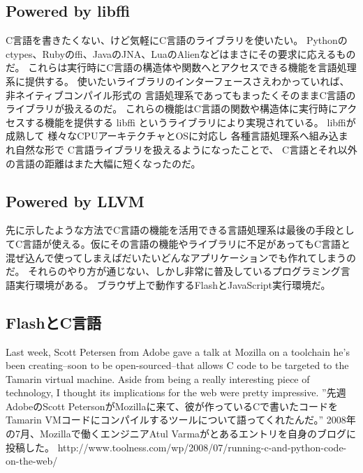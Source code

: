 \subsection{Powered by libffi}
C言語を書きたくない、けど気軽にC言語のライブラリを使いたい。
Pythonのctypes、Rubyのffi、JavaのJNA、LuaのAlienなどはまさにその要求に応えるものだ。
これらは実行時にC言語の構造体や関数へとアクセスできる機能を言語処理系に提供する。
使いたいライブラリのインターフェースさえわかっていれば、非ネイティブコンパイル形式の
言語処理系であってもまったくそのままC言語のライブラリが扱えるのだ。
これらの機能はC言語の関数や構造体に実行時にアクセスする機能を提供する
libffi
というライブラリにより実現されている。
libffiが成熟して
様々なCPUアーキテクチャとOSに対応し
各種言語処理系へ組み込まれ自然な形で
C言語ライブラリを扱えるようになったことで、
C言語とそれ以外の言語の距離はまた大幅に短くなったのだ。

\subsection{Powered by LLVM}
先に示したような方法でC言語の機能を活用できる言語処理系は最後の手段としてC言語が使える。仮にその言語の機能やライブラリに不足があってもC言語と混ぜ込んで使ってしまえばだいたいどんなアプリケーションでも作れてしまうのだ。
それらのやり方が通じない、しかし非常に普及しているプログラミング言語実行環境がある。
ブラウザ上で動作するFlashとJavaScript実行環境だ。



\subsection{FlashとC言語} %
Last week, Scott Petersen from Adobe gave a talk at Mozilla on a toolchain he’s been creating--soon to be open-sourced--that allows C code to be targeted to the Tamarin virtual machine. Aside from being a really interesting piece of technology, I thought its implications for the web were pretty impressive.
”先週AdobeのScott PetersonがMozillaに来て、彼が作っているCで書いたコードをTamarin VMコードにコンパイルするツールについて語ってくれたんだ。”
2008年の7月、Mozillaで働くエンジニアAtul Varmaがとあるエントリを自身のブログに投稿した。
http://www.toolness.com/wp/2008/07/running-c-and-python-code-on-the-web/

% 
% 
% 

